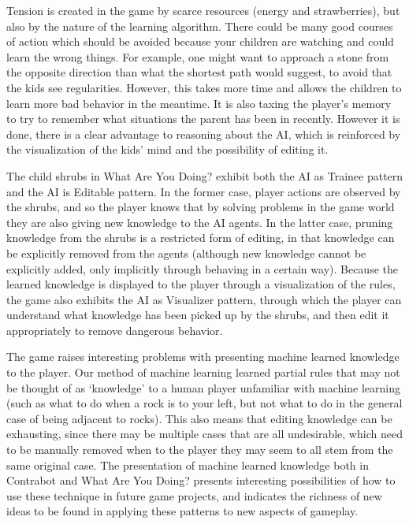 \documentclass{sig-alternate}
\begin{document}
Tension is created in the game by scarce resources (energy and
strawberries), but also by the nature of the learning algorithm.
There could be many good courses of action which should be
avoided because your children are watching and could learn the
wrong things. For example, one might want to approach a stone
from the opposite direction than what the shortest path would
suggest, to avoid that the kids see regularities. However, this takes
more time and allows the children to learn more bad behavior in
the meantime. It is also taxing the player's memory to try to
remember what situations the parent has been in recently.
However it is done, there is a clear advantage to reasoning about
the AI, which is reinforced by the visualization of the kids' mind
and the possibility of editing it.

The child shrubs in What Are You Doing? exhibit both the AI as
Trainee pattern and the AI is Editable pattern. In the former case,
player actions are observed by the shrubs, and so the player knows
that by solving problems in the game world they are also giving
new knowledge to the AI agents. In the latter case, pruning
knowledge from the shrubs is a restricted form of editing, in that
knowledge can be explicitly removed from the agents (although
new knowledge cannot be explicitly added, only implicitly
through behaving in a certain way). Because the learned
knowledge is displayed to the player through a visualization of the
rules, the game also exhibits the AI as Visualizer pattern, through
which the player can understand what knowledge has been picked
up by the shrubs, and then edit it appropriately to remove
dangerous behavior.

The game raises interesting problems with presenting machine
learned knowledge to the player. Our method of machine learning
learned partial rules that may not be thought of as ‘knowledge’ to
a human player unfamiliar with machine learning (such as what to
do when a rock is to your left, but not what to do in the general
case of being adjacent to rocks). This also means that editing
knowledge can be exhausting, since there may be multiple cases
that are all undesirable, which need to be manually removed when
to the player they may seem to all stem from the same original
case. The presentation of machine learned knowledge both in
Contrabot and What Are You Doing? presents interesting
possibilities of how to use these technique in future game projects,
and indicates the richness of new ideas to be found in applying
these patterns to new aspects of gameplay.

\cite{smith2012:endlessweb}



\end{document}
